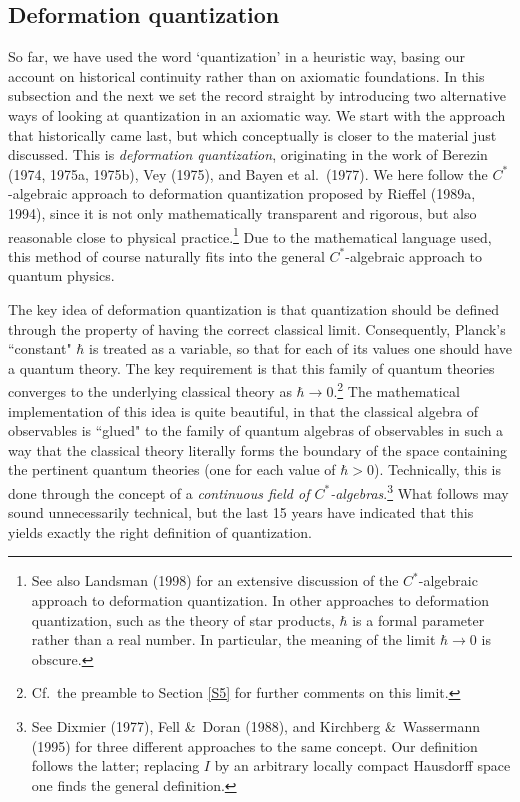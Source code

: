 \documentclass[12pt,titlepage]{article}
\newcommand{\ca}{$C^*$-algebra} \newcommand{\jba}{JB-algebra}
\newcommand{\raw}{\rightarrow} \newcommand{\rat}{\mapsto}
\begin{document}
 \subsection{Deformation quantization}\label{DQsection}
 So far, we have used the word `quantization' in a heuristic way, basing our account on historical continuity rather than on axiomatic foundations. In this subsection and the next we set the record straight by introducing two alternative ways of looking at quantization in an axiomatic way. We start with the approach that historically came last, but which conceptually is closer to the material just discussed. This is {\it deformation quantization}, originating in the work of Berezin (1974, 1975a, 1975b), Vey (1975),  and  Bayen et al.\ (1977). We here follow the \ca ic approach to deformation quantization proposed by Rieffel (1989a, 1994), since it is not only mathematically transparent and rigorous, but also reasonable close to physical practice.\footnote{See also Landsman (1998) for an extensive discussion of the  \ca ic approach to deformation quantization. In other approaches  to deformation quantization, such as the theory of star products, $\hbar$ is a formal parameter rather than a real number. In particular, the meaning of the limit $\hbar\raw 0$ is obscure.} Due to the mathematical language used, this method of course naturally fits into the general  $C^*$-algebraic approach to quantum physics.
 
The key idea of  deformation quantization is that quantization should be defined through the property of having the correct classical limit. Consequently, Planck's ``constant" $\hbar$ is treated as a variable, so that for each of its values one should have a quantum theory. The key requirement is that this family of quantum theories converges to the underlying classical theory as $\hbar\raw 0$.\footnote{Cf.\ the preamble to Section \ref{S5} for further comments on this limit.}  The mathematical implementation of this idea is quite beautiful, in that the classical algebra of observables is ``glued" to the family of quantum  algebras of observables in such a way that the classical theory  literally forms the boundary of the space containing the pertinent quantum theories (one for each value of $\hbar>0$). Technically, this is done through the concept of a {\it continuous field of
 \ca s}.\footnote{See Dixmier (1977), Fell \&\ Doran (1988), and Kirchberg \&\  Wassermann (1995) for three different approaches to the same concept. Our definition follows the latter;
replacing $I$ by an arbitrary locally compact Hausdorff space one finds the general definition.}  What follows may sound unnecessarily technical, but the last 15 years have indicated that this yields exactly the right definition of quantization.
\end{document}
